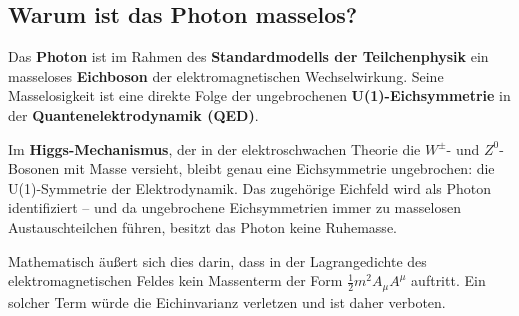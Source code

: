 \subsection{Warum ist das Photon masselos?}


Das \textbf{Photon} ist im Rahmen des \textbf{Standardmodells der Teilchenphysik} ein masseloses \textbf{Eichboson} der elektromagnetischen Wechselwirkung.  
Seine Masselosigkeit ist eine direkte Folge der ungebrochenen \textbf{U(1)-Eichsymmetrie} in der \textbf{Quantenelektrodynamik (QED)}.

Im \textbf{Higgs-Mechanismus}, der in der elektroschwachen Theorie die \(W^\pm\)- und \(Z^0\)-Bosonen mit Masse versieht, bleibt genau eine Eichsymmetrie ungebrochen: die U(1)-Symmetrie der Elektrodynamik.  
Das zugehörige Eichfeld wird als Photon identifiziert – und da ungebrochene Eichsymmetrien immer zu masselosen Austauschteilchen führen, besitzt das Photon keine Ruhemasse.

Mathematisch äußert sich dies darin, dass in der Lagrangedichte des elektromagnetischen Feldes kein Massenterm der Form \(\frac{1}{2} m^2 A_\mu A^\mu\) auftritt.  
Ein solcher Term würde die Eichinvarianz verletzen und ist daher verboten.

